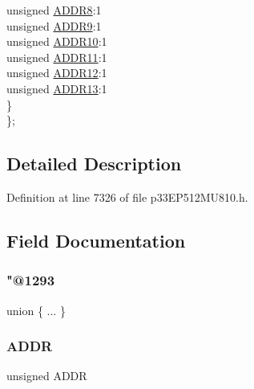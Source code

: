 \begin{DoxyCompactItemize}
\begin{tabbing}
\>\>unsigned \hyperlink{structtag_p_m_d_o_u_t1_b_i_t_s_afced7180e90ecea43d2c2a985d99d3d6}{ADDR8}:1\\
\>\>unsigned \hyperlink{structtag_p_m_d_o_u_t1_b_i_t_s_a48027128d2bc0eaa0a7ba769f26d0d45}{ADDR9}:1\\
\>\>unsigned \hyperlink{structtag_p_m_d_o_u_t1_b_i_t_s_aa1822eec276bbfaf3cb47bb28ce1bcf3}{ADDR10}:1\\
\>\>unsigned \hyperlink{structtag_p_m_d_o_u_t1_b_i_t_s_a34135996c555ad3570d9eb04396fb129}{ADDR11}:1\\
\>\>unsigned \hyperlink{structtag_p_m_d_o_u_t1_b_i_t_s_ac2cfb0a4fdea1ea2d7eab15e9294d5cc}{ADDR12}:1\\
\>\>unsigned \hyperlink{structtag_p_m_d_o_u_t1_b_i_t_s_ac15b4e791b5e2127d193508e6d36b574}{ADDR13}:1\\
\>\} \\
\}; \\

\end{tabbing}\end{DoxyCompactItemize}


\subsection{Detailed Description}


Definition at line 7326 of file p33\+E\+P512\+M\+U810.\+h.



\subsection{Field Documentation}
\mbox{\label{structtag_p_m_d_o_u_t1_b_i_t_s_aafd1ee2f408d861301c3054b0ee4a8b7}} 
\subsubsection{\texorpdfstring{"@1293}{@1293}}
{\footnotesize\ttfamily union \{ ... \} }

\mbox{\label{structtag_p_m_d_o_u_t1_b_i_t_s_a086bf948e86b578064844ddab11f4a23}} 
\subsubsection{\texorpdfstring{A\+D\+DR}{ADDR}}
{\footnotesize\ttfamily unsigned A\+D\+DR}



